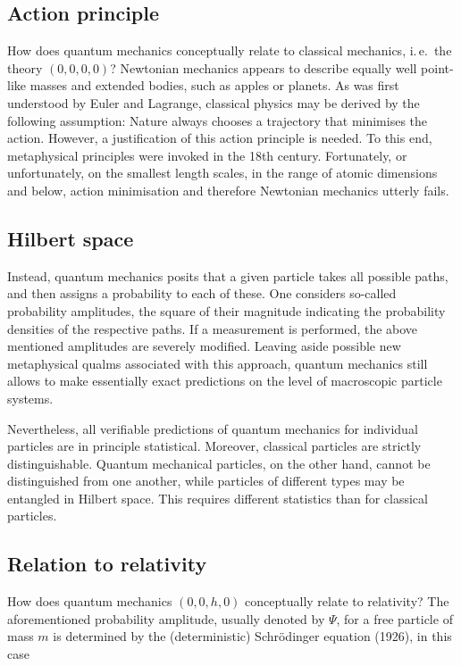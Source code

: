 \documentclass{scrartcl}
\begin{document}
\subsection*{Action principle}

How does quantum mechanics conceptually relate to classical mechanics, i.\,e.\ the theory $(0,0,0,0)$? Newtonian mechanics appears to describe equally well point-like masses and extended bodies, such as apples or planets. As was first understood by Euler and Lagrange, classical physics may be derived by the following assumption: Nature always chooses a trajectory that minimises the action. However, a justification of this action principle is needed. To this end, metaphysical principles were invoked in the 18th century. Fortunately, or unfortunately, on the smallest length scales, in the range of atomic dimensions and below, action minimisation and therefore Newtonian mechanics utterly fails.


\subsection*{Hilbert space}

Instead, quantum mechanics posits that a given particle takes all possible paths, and then assigns a probability to each of these. One considers so-called probability amplitudes, the square of their magnitude indicating the probability densities of the respective paths. If a measurement is performed, the above mentioned amplitudes are severely modified. Leaving aside possible new metaphysical qualms associated with this approach, quantum mechanics still allows to make essentially exact predictions on the level of macroscopic particle systems.

Nevertheless, all verifiable predictions of quantum mechanics for individual particles are in principle statistical. Moreover, classical particles are strictly distinguishable. Quantum mechanical particles, on the other hand, cannot be distinguished from one another, while particles of different types may be entangled in Hilbert space. This requires different statistics than for classical particles.


\subsection*{Relation to relativity}

How does quantum mechanics $(0,0,h,0)$ conceptually relate to relativity? The aforementioned probability amplitude, usually denoted by $\Psi$, for a free particle of mass $m$ is determined by the (deterministic) Schrödinger equation (1926), in this case
\end{document}
